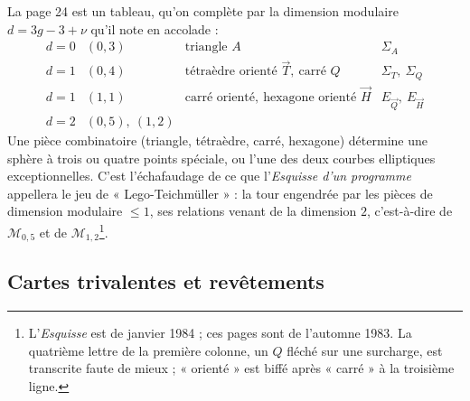 \documentclass[11pt,a4paper]{article}
\begin{document}
La page 24 est un tableau, qu'on complète par la dimension modulaire $d = 3g -
3 + \nu$ qu'il note en accolade :
\[
\begin{array}{llll}
d = 0 & (0,3) & \text{triangle } A & \Sigma_A \\
d = 1 & (0,4) & \text{tétraèdre orienté } \vec{T},\ \text{carré } Q & \Sigma_T,\ \Sigma_Q \\
d = 1 & (1,1) & \text{carré orienté},\ \text{hexagone orienté } \vec{H} & E_{\vec{Q}},\ E_{\vec{H}} \\
d = 2 & (0,5),\ (1,2) & &
\end{array}
\]
Une pièce combinatoire (triangle, tétraèdre, carré, hexagone) détermine une
sphère à trois ou quatre points spéciale, ou l'une des deux courbes
elliptiques exceptionnelles. C'est l'échafaudage de ce que l'\emph{Esquisse
d'un programme} appellera le jeu de « Lego-Teichmüller » : la tour engendrée
par les pièces de dimension modulaire $\leq 1$, ses relations venant de la
dimension $2$, c'est-à-dire de $\mathcal{M}_{0,5}$ et de
$\mathcal{M}_{1,2}$\footnote{L'\emph{Esquisse} est de janvier 1984 ; ces pages
sont de l'automne 1983. La quatrième lettre de la première colonne, un $Q$
fléché sur une surcharge, est transcrite faute de mieux ; « orienté » est biffé
après « carré » à la troisième ligne.}.

\subsection*{Cartes trivalentes et revêtements}
\end{document}
